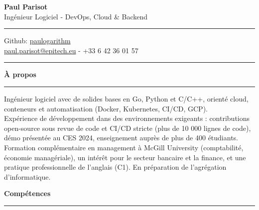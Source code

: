 \documentclass[9pt]{extarticle}
\begin{document}
\begin{center}
	{\huge\bfseries Paul Parisot}
	\\[9pt]
	{\Large Ingénieur Logiciel - DevOps, Cloud \& Backend}
	\\
\end{center}


\par\vspace{-5pt}
\rule{\linewidth}{0.4pt}
\par\vspace{-5pt}

\begin{center}
	Github: \href{https://github.com/paulogarithm}{paulogarithm}
	\\
	\href{mailto:paul.parisot@epitech.eu}{paul.parisot@epitech.eu} - +33 6 42 36 01 57
	\\
\end{center}

\par\vspace{-10pt}
\rule{\linewidth}{0.4pt}
\par\vspace{7pt}


{\large\bfseries À propos}
\par\vspace{-8pt}
\rule{\linewidth}{0.4pt}
\par\vspace{5pt}

Ingénieur logiciel avec de solides bases en Go, Python et C/C++, orienté cloud, conteneurs et automatisation (Docker, Kubernetes, CI/CD, GCP).
\\
Expérience de développement dans des environnements exigeants : contributions open-source sous revue de code et CI/CD stricte (plus de 10 000 lignes de code), démo présentée au CES 2024, enseignement auprès de plus de 400 étudiants.
\\
Formation complémentaire en management à McGill University (comptabilité, économie managériale), un intérêt pour le secteur bancaire et la finance, et une pratique professionnelle de l'anglais (C1). En préparation de l'agrégation d'informatique.
\par\vspace{5pt}


{\large\bfseries Compétences}
\par\vspace{-8pt}
\rule{\linewidth}{0.4pt}
\par\vspace{5pt}
\end{document}
